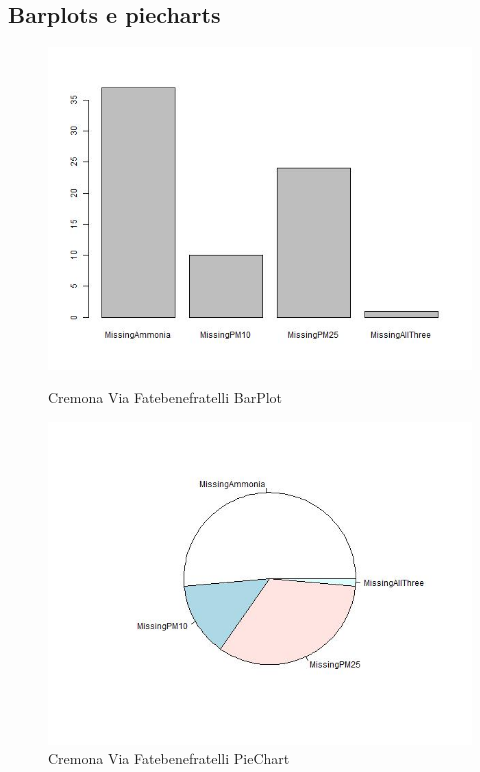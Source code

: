 \documentclass{article}
\begin{document}
\subsection{Barplots e piecharts}
\begin{figure}[H]
  \centering 
  \includegraphics[scale = 0.4]{Picture/Barplots e piecharts/Cremona Via Fatebenefratelli BarPlotMV.jpeg}
  \caption{Cremona Via Fatebenefratelli BarPlot}
  \centering
  \centering 
  \includegraphics[scale = 0.4]{Picture/Barplots e piecharts/Cremona Via Fatebenefratelli PieChartMV.jpeg}
  \caption{Cremona Via Fatebenefratelli PieChart}
  \centering
\end{figure}
\newpage
\end{document}
